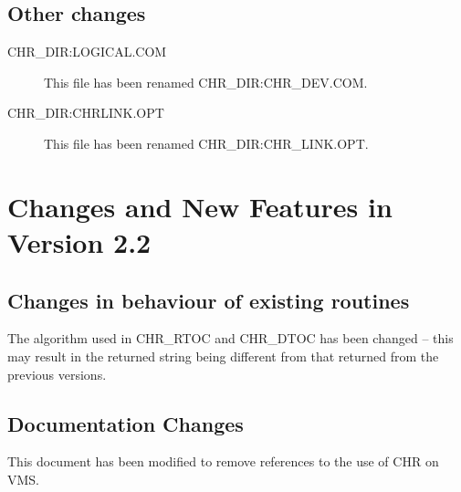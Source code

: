 \subsection {Other changes}

\begin{description}
\item [CHR\_DIR:LOGICAL.COM] This file has been renamed CHR\_DIR:CHR\_DEV.COM.
\item [CHR\_DIR:CHRLINK.OPT] This file has been renamed CHR\_DIR:CHR\_LINK.OPT.
\end {description}

\section {Changes and New Features in Version 2.2}
\subsection {Changes in behaviour of existing routines}
The algorithm used in CHR\_RTOC and CHR\_DTOC has been changed --
this may result in the returned string being different from that returned 
from the previous versions.

\subsection{Documentation Changes}
This document has been modified to remove references to the use of CHR on VMS.


